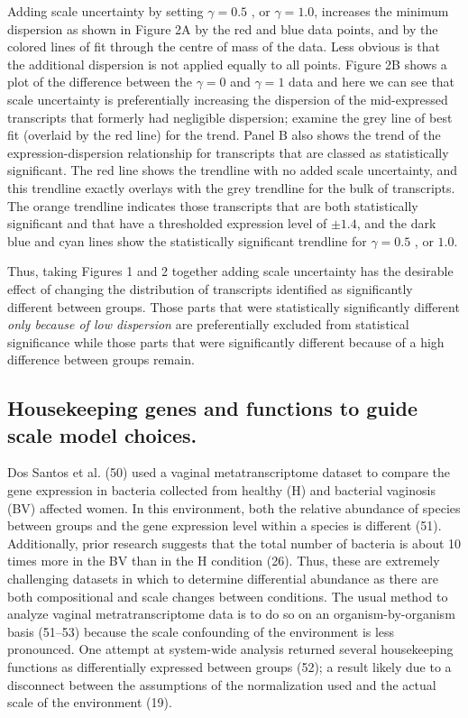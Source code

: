 \documentclass[
]{article}
\begin{document}
Adding scale uncertainty by setting \(\gamma=0.5\) , or
\(\gamma = 1.0\), increases the minimum dispersion as shown in Figure 2A
by the red and blue data points, and by the colored lines of fit through
the centre of mass of the data. Less obvious is that the additional
dispersion is not applied equally to all points. Figure 2B shows a plot
of the difference between the \(\gamma= 0\) and \(\gamma= 1\) data and
here we can see that scale uncertainty is preferentially increasing the
dispersion of the mid-expressed transcripts that formerly had negligible
dispersion; examine the grey line of best fit (overlaid by the red line)
for the trend. Panel B also shows the trend of the expression-dispersion
relationship for transcripts that are classed as statistically
significant. The red line shows the trendline with no added scale
uncertainty, and this trendline exactly overlays with the grey trendline
for the bulk of transcripts. The orange trendline indicates those
transcripts that are both statistically significant and that have a
thresholded expression level of \(\pm 1.4\), and the dark blue and cyan
lines show the statistically significant trendline for \(\gamma=0.5\) ,
or \(1.0\).

Thus, taking Figures 1 and 2 together adding scale uncertainty has the
desirable effect of changing the distribution of transcripts identified
as significantly different between groups. Those parts that were
statistically significantly different \emph{only because of low
dispersion} are preferentially excluded from statistical significance
while those parts that were significantly different because of a high
difference between groups remain.

\subsection{Housekeeping genes and functions to guide scale model
choices.}\label{housekeeping-genes-and-functions-to-guide-scale-model-choices.}

Dos Santos et al. (50) used a vaginal metatranscriptome dataset to
compare the gene expression in bacteria collected from healthy (H) and
bacterial vaginosis (BV) affected women. In this environment, both the
relative abundance of species between groups and the gene expression
level within a species is different (51). Additionally, prior research
suggests that the total number of bacteria is about 10 times more in the
BV than in the H condition (26). Thus, these are extremely challenging
datasets in which to determine differential abundance as there are both
compositional and scale changes between conditions. The usual method to
analyze vaginal metratranscriptome data is to do so on an
organism-by-organism basis (51--53) because the scale confounding of the
environment is less pronounced. One attempt at system-wide analysis
returned several housekeeping functions as differentially expressed
between groups (52); a result likely due to a disconnect between the
assumptions of the normalization used and the actual scale of the
environment (19).
\end{document}
